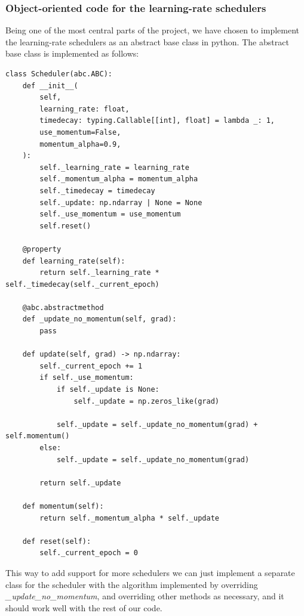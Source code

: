 \documentclass{article}
\begin{document}
\subsubsection{Object-oriented code for the learning-rate schedulers}
Being one of the most central parts of the project, we have chosen to implement
the learning-rate schedulers as an abstract base class in python. The abstract
base class is implemented as follows:

\begin{lstlisting}
class Scheduler(abc.ABC):
    def __init__(
        self,
        learning_rate: float,
        timedecay: typing.Callable[[int], float] = lambda _: 1,
        use_momentum=False,
        momentum_alpha=0.9,
    ):
        self._learning_rate = learning_rate
        self._momentum_alpha = momentum_alpha
        self._timedecay = timedecay
        self._update: np.ndarray | None = None
        self._use_momentum = use_momentum
        self.reset()

    @property
    def learning_rate(self):
        return self._learning_rate * self._timedecay(self._current_epoch)

    @abc.abstractmethod
    def _update_no_momentum(self, grad):
        pass

    def update(self, grad) -> np.ndarray:
        self._current_epoch += 1
        if self._use_momentum:
            if self._update is None:
                self._update = np.zeros_like(grad)

            self._update = self._update_no_momentum(grad) + self.momentum()
        else:
            self._update = self._update_no_momentum(grad)

        return self._update

    def momentum(self):
        return self._momentum_alpha * self._update

    def reset(self):
        self._current_epoch = 0
\end{lstlisting}

This way to add support for more schedulers we can just implement a separate
class for the scheduler with the algorithm implemented by overriding
\textit{\_update\_no\_momentum}, and overriding other methods as necessary, and
it should work well with the rest of our code.
\end{document}
